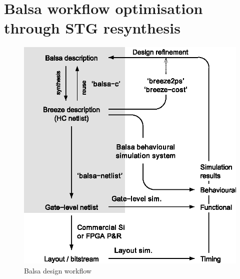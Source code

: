 \section{Balsa workflow optimisation through STG resynthesis}

\label{sec:balsa-workflow}

\begin{figure}
\begin{centering}
\includegraphics[width=0.45\paperwidth]{figures/balsa-design-workflow}
\par\end{centering}

\centering{}\caption{Balsa design workflow\label{fig:Balsa-design-workflow}}
\end{figure}


